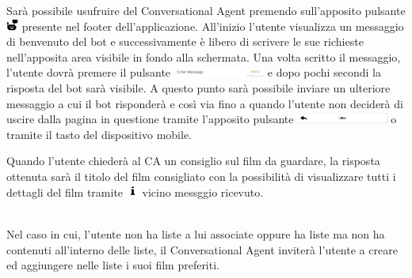 \documentclass[a4paper, 10pt]{report}
\begin{document}
        Sarà possibile usufruire del Conversational Agent premendo sull'apposito pulsante \includegraphics[width=0.4cm]{deployment/icona_chatbot.png}
        presente nel footer dell'applicazione.
        All'inizio l'utente visualizza un messaggio di benvenuto del bot e successivamente è libero di scrivere le sue
        richieste nell'apposita area visibile in fondo alla schermata. Una volta scritto il messaggio, l'utente dovrà premere il pulsante
        \includegraphics[width=3cm]{deployment/tasto_invia.png} e dopo pochi secondi la risposta del bot sarà visibile.
        A questo punto sarà possibile inviare un ulteriore messaggio a cui il bot risponderà e così via fino a quando l'utente non deciderà
        di uscire dalla pagina in questione tramite l'apposito pulsante \includegraphics[width=3cm]{deployment/tasto_back.png}
        o tramite il tasto  del dispositivo mobile.

        Quando l'utente chiederà al CA un consiglio sul film da guardare, la risposta ottenuta sarà il titolo del film consigliato
        con la possibilità di visualizzare tutti i dettagli del film tramite \includegraphics[width=0.4cm]{deployment/icona_information.png}
        vicino messggio ricevuto.

        \\Nel caso in cui, l'utente non ha liste a lui associate oppure ha liste ma non ha contenuti all'interno delle liste,
        il Conversational Agent inviterà l'utente a creare ed aggiungere nelle liste i suoi film preferiti.
\end{document}

